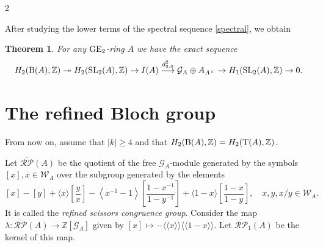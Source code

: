 \documentclass[a0]{sciposter}
\newtheorem{prp}{Proposition}
\newtheorem{thm}{Theorem}
\theoremstyle{definition}
\newcommand{\z}{\mathbb{Z}}
\newcommand{\GG}{\mathcal{G}}
\newcommand{\WW}{\mathcal{W}}
\newcommand{\RP}{\mathcal{RP}}
\renewcommand{\aa}{{A^\times}}
\newcommand{\arr}{\rightarrow}
\newcommand{\larr}{\longrightarrow}
\newcommand{\Lan}{\langle \! \langle}
\newcommand{\Ran}{\rangle \! \rangle}
\newcommand{\Bb}{{\rm B}}
\newcommand{\Tt}{{\rm T}}
\newcommand{\GE}{{\rm GE}}
\newcommand{\SL}{{\rm SL}}
\begin{document}
\begin{multicols}{2}

After studying the lower terms of the spectral sequence \ref{spectral}, we obtain 

\begin{thm}\label{H2IA}
For any $\GE_2$-ring $A$ we have the exact sequence
$$H_2(\Bb(A),\z)\twoheadrightarrow  H_2(\SL_2(A), \z) \arr I(A) \overset{d_{2,0}^2}{\larr} \GG_A\oplus A_\aa 
\arr H_1(\SL_2(A),\z) \arr 0.$$
\end{thm}



\section{The refined Bloch group}

From now on, assume that $|k| \geq 4 $ and that $H_2(\Bb(A),\z)= H_2(\Tt(A),\z)$.

Let $\overline{\RP}(A)$ be the quotient of the free $\GG_A$-module generated by the symbols $[x], x \in \WW_A$ over the subgroup generated by the elements
$$
[x]-[y]+\langle x\rangle\left[\frac{y}{x}\right]-\left\langle x^{-1}-1\right\rangle\left[\frac{1-x^{-1}}{1-y^{-1}}\right]+\langle 1-x\rangle\left[\frac{1-x}{1-y}\right], \quad x, y, x / y \in \WW_A .
$$
It is called the \textit{refined scissors congruence group}. Consider the map $\lambda: \overline{\RP}(A) \arr \mathbb{Z}\left[\GG_A\right]$ given by
$
[x] \mapsto -\langle\langle x\rangle\rangle\langle\langle 1-x\rangle\rangle.
$
Let $\overline{\RP}_1(A)$ be the kernel of this map.


\end{multicols}
\end{document}

